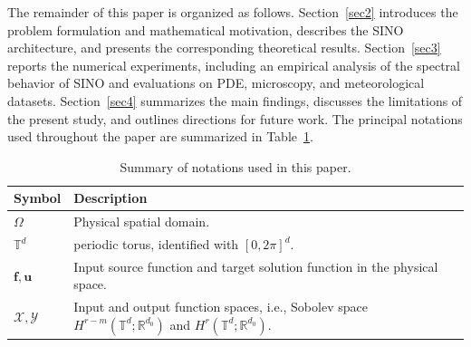 \documentclass[preprint,numbers,sort&compress]{elsarticle}
\begin{document}
		The remainder of this paper is organized as follows.
		Section~\ref{sec2} introduces the problem formulation and mathematical
		motivation, describes the SINO architecture, and presents the corresponding
		theoretical results. Section~\ref{sec3} reports the numerical experiments,
		including an empirical analysis of the spectral behavior of SINO and
		evaluations on PDE, microscopy, and meteorological datasets.
		Section~\ref{sec4} summarizes the main findings, discusses the limitations
		of the present study, and outlines directions for future work. The principal
		notations used throughout the paper are summarized in
		Table~\ref{tab:notations}.
		
		\begin{table}[t]
			\centering
			\caption{Summary of notations used in this paper.}
			\label{tab:notations}
			\begin{tabular}{ll}
				\hline
				\textbf{Symbol} & \textbf{Description} \\ \hline
				$\Omega$ & Physical spatial domain. \\
				$\mathbb{T}^d$ & periodic torus, identified with $[0, 2\pi]^d$. \\
				$\boldsymbol{f}, \boldsymbol{u}$ & Input source function and target solution function in the physical space. \\
				$\mathcal{X}, \mathcal{Y}$ & Input and output function spaces, i.e., Sobolev space { {$H^{r-m}(\mathbb{T}^d; \mathbb{R}^{d_0})$ and $H^r(\mathbb{T}^d; \mathbb{R}^{d_0})$.}} \\

\end{tabular}
\end{table}
\end{document}
